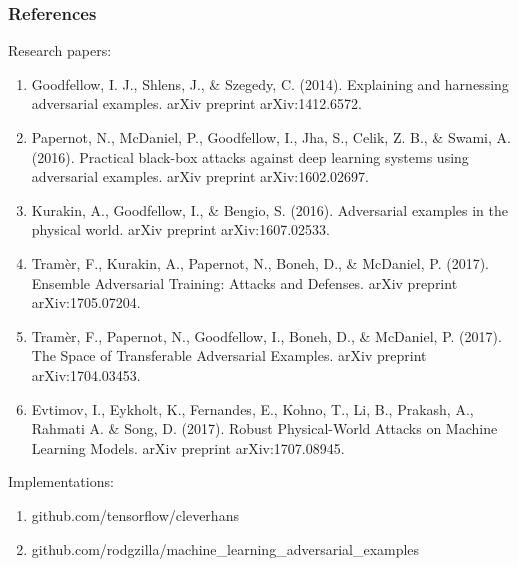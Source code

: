 \documentclass[9pt]{beamer}
\begin{document}
\begin{frame}
  \frametitle{References}

  Research papers:
  {\footnotesize
    \begin{enumerate}
    \item Goodfellow, I. J., Shlens, J., \& Szegedy,
      C. (2014). Explaining and harnessing adversarial
      examples. arXiv preprint arXiv:1412.6572.
    \item Papernot, N., McDaniel, P., Goodfellow, I., Jha, S., Celik,
      Z. B., \& Swami, A. (2016). Practical black-box attacks against
      deep learning systems using adversarial examples. arXiv preprint
      arXiv:1602.02697.
    \item Kurakin, A., Goodfellow, I., \& Bengio,
      S. (2016). Adversarial examples in the physical world. arXiv
      preprint arXiv:1607.02533.
    \item Tramèr, F., Kurakin, A., Papernot, N., Boneh, D., \&
      McDaniel, P. (2017). Ensemble Adversarial Training: Attacks and
      Defenses. arXiv preprint arXiv:1705.07204.
    \item Tramèr, F., Papernot, N., Goodfellow, I., Boneh, D., \&
      McDaniel, P. (2017). The Space of Transferable Adversarial
      Examples. arXiv preprint arXiv:1704.03453.
    \item Evtimov, I., Eykholt, K., Fernandes, E., Kohno, T., Li, B.,
      Prakash, A., Rahmati A. \& Song, D. (2017). Robust Physical-World
      Attacks on Machine Learning Models. arXiv preprint
      arXiv:1707.08945.
    \end{enumerate}
  }

  \bigskip

  Implementations:
  \begin{enumerate}
  \item github.com/tensorflow/cleverhans
  \item github.com/rodgzilla/machine\_learning\_adversarial\_examples
  \end{enumerate}

\end{frame}

\appendix
\end{document}
